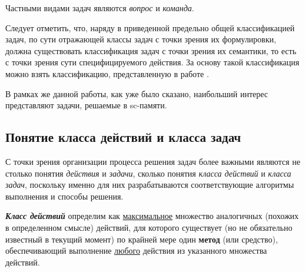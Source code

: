 Частными видами задач являются \textit{вопрос} и \textit{команда}.

\begin{SCn}
	\begin{scnindent}
	\end{scnindent}

\end{SCn}


Следует отметить, что, наряду в приведенной предельно общей классификацией задач, по сути отражающей классы задач с точки зрения их формулировки, должна существовать классификация задач с точки зрения их семантики, то есть с точки зрения сути специфицируемого действия. За основу такой классификация можно взять классификацию, представленную в работе \cite{Fayans2020}.

В рамках же данной работы, как уже было сказано, наибольший интерес представляют задачи, решаемые в sc-памяти.

\subsection{Понятие класса действий и класса задач}
\label{subsec_action_and_problem_classes}

С точки зрения организации процесса решения задач более важными являются не столько понятия \textit{действия} и \textit{задачи}, сколько понятия \textit{класса действий} и \textit{класса задач}, поскольку именно для них разрабатываются соответствующие алгоритмы выполнения и способы решения.

\textbf{\textit{Класс действий}} определим как \underline{максимальное} множество аналогичных (похожих в определенном смысле) действий, для которого существует (но не обязательно известный в текущий момент) по крайней мере один \textbf{метод} (или средство), обеспечивающий выполнение \underline{любого} действия из указанного множества действий.


